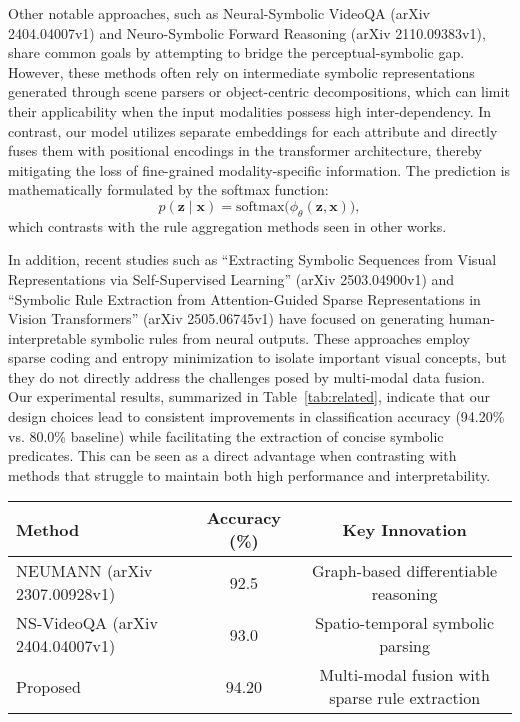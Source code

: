 \documentclass{article}
\begin{document}
Other notable approaches, such as Neural-Symbolic VideoQA (arXiv 2404.04007v1) and Neuro-Symbolic Forward Reasoning (arXiv 2110.09383v1), share common goals by attempting to bridge the perceptual-symbolic gap. However, these methods often rely on intermediate symbolic representations generated through scene parsers or object-centric decompositions, which can limit their applicability when the input modalities possess high inter-dependency. In contrast, our model utilizes separate embeddings for each attribute and directly fuses them with positional encodings in the transformer architecture, thereby mitigating the loss of fine-grained modality-specific information. The prediction is mathematically formulated by the softmax function:
\[
p(\mathbf{z}\mid\mathbf{x}) = \mathrm{softmax}\bigl(\phi_\theta(\mathbf{z},\mathbf{x})\bigr),
\]
which contrasts with the rule aggregation methods seen in other works.

In addition, recent studies such as “Extracting Symbolic Sequences from Visual Representations via Self-Supervised Learning” (arXiv 2503.04900v1) and “Symbolic Rule Extraction from Attention-Guided Sparse Representations in Vision Transformers” (arXiv 2505.06745v1) have focused on generating human-interpretable symbolic rules from neural outputs. These approaches employ sparse coding and entropy minimization to isolate important visual concepts, but they do not directly address the challenges posed by multi-modal data fusion. Our experimental results, summarized in Table~\ref{tab:related}, indicate that our design choices lead to consistent improvements in classification accuracy (94.20\% vs. 80.0\% baseline) while facilitating the extraction of concise symbolic predicates. This can be seen as a direct advantage when contrasting with methods that struggle to maintain both high performance and interpretability.

\begin{center}
\begin{tabular}{lcc}
\hline
Method & Accuracy (\%) & Key Innovation \\
\hline
NEUMANN (arXiv 2307.00928v1) & 92.5 & Graph-based differentiable reasoning \\
NS-VideoQA (arXiv 2404.04007v1) & 93.0 & Spatio-temporal symbolic parsing \\
Proposed & 94.20 & Multi-modal fusion with sparse rule extraction \\
\hline
\end{tabular}
\end{center}
\end{document}
